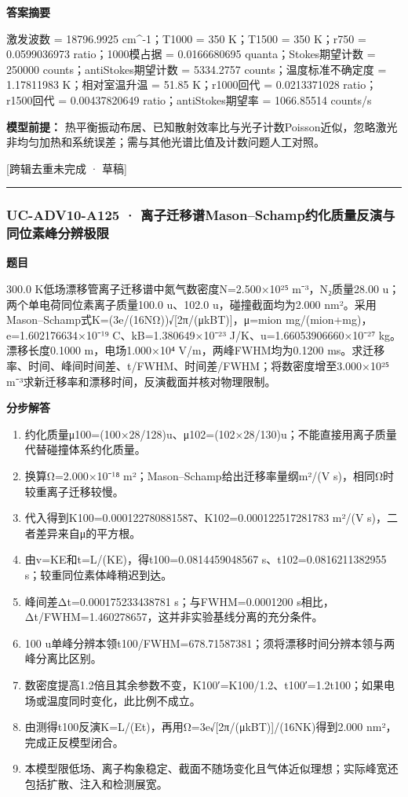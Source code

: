 \documentclass[UTF8,11pt,a4paper]{ctexart}
\begin{document}
\noindent\textbf{答案摘要}\par
激发波数 = 18796.9925 cm\textasciicircum{}-1；T1000 = 350 K；T1500 = 350 K；r750 = 0.0599036973 ratio；1000模占据 = 0.0166680695 quanta；Stokes期望计数 = 250000 counts；antiStokes期望计数 = 5334.2757 counts；温度标准不确定度 = 1.17811983 K；相对室温升温 = 51.85 K；r1000回代 = 0.0213371028 ratio；r1500回代 = 0.00437820649 ratio；antiStokes期望率 = 1066.85514 counts/s\par
\noindent\textbf{模型前提：}
热平衡振动布居、已知散射效率比与光子计数Poisson近似，忽略激光非均匀加热和系统误差；需与其他光谱比值及计数问题人工对照。\par
\noindent\textcolor{red!65!black}{[跨辑去重未完成 · 草稿]} \par
\medskip\hrule\medskip
{}
\subsubsection*{UC-ADV10-A125 · 离子迁移谱Mason–Schamp约化质量反演与同位素峰分辨极限}
\noindent\textbf{题目}\par
300.0 K低场漂移管离子迁移谱中氮气数密度N=2.500×10²⁵ m⁻³，N₂质量28.00 u；两个单电荷同位素离子质量100.0 u、102.0 u，碰撞截面均为2.000 nm²。采用Mason–Schamp式K=(3e/(16NΩ))√[2π/(μkBT)]，μ=mion mg/(mion+mg)，e=1.602176634×10⁻¹⁹ C、kB=1.380649×10⁻²³ J/K、u=1.66053906660×10⁻²⁷ kg。漂移长度0.1000 m，电场1.000×10⁴ V/m，两峰FWHM均为0.1200 ms。求迁移率、时间、峰间时间差、t/FWHM、时间差/FWHM；将数密度增至3.000×10²⁵ m⁻³求新迁移率和漂移时间，反演截面并核对物理限制。\par
\medskip\noindent\textbf{分步解答}
\begin{enumerate}
\item 约化质量μ100=(100×28/128)u、μ102=(102×28/130)u；不能直接用离子质量代替碰撞体系约化质量。
\item 换算Ω=2.000×10⁻¹⁸ m²；Mason–Schamp给出迁移率量纲m²/(V s)，相同Ω时较重离子迁移较慢。
\item 代入得到K100=0.000122780881587、K102=0.000122517281783 m²/(V s)，二者差异来自μ的平方根。
\item 由v=KE和t=L/(KE)，得t100=0.0814459048567 s、t102=0.0816211382955 s；较重同位素体峰稍迟到达。
\item 峰间差Δt=0.000175233438781 s；与FWHM=0.0001200 s相比，Δt/FWHM=1.460278657，这并非实验基线分离的充分条件。
\item 100 u单峰分辨本领t100/FWHM=678.71587381；须将漂移时间分辨本领与两峰分离比区别。
\item 数密度提高1.2倍且其余参数不变，K100′=K100/1.2、t100′=1.2t100；如果电场或温度同时变化，此比例不成立。
\item 由测得t100反演K=L/(Et)，再用Ω=3e√[2π/(μkBT)]/(16NK)得到2.000 nm²，完成正反模型闭合。
\item 本模型限低场、离子构象稳定、截面不随场变化且气体近似理想；实际峰宽还包括扩散、注入和检测展宽。
\end{enumerate}
\end{document}
